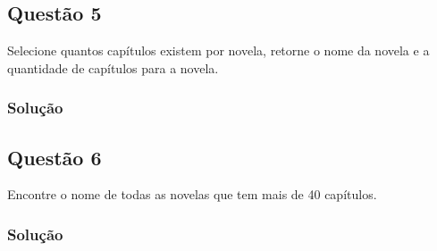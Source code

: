 \documentclass{assignment}
\begin{document}
\subsection*{Questão 5}
Selecione quantos capítulos existem por novela, retorne o nome da novela e a quantidade de
capítulos para a novela.
\subsubsection*{Solução}


\subsection*{Questão 6}
Encontre o nome de todas as novelas que tem mais de 40 capítulos.
\subsubsection*{Solução}

\end{document}
